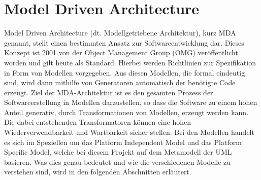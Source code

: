 \section{Model Driven Architecture} \label{MDA}
Model Driven Architecture (dt. Modellgetriebene Architektur), kurz MDA genannt,
stellt einen bestimmten Ansatz zur Softwareentwicklung dar. Dieses Konzept ist
2001 von der Object Management Group (OMG) veröffentlicht worden und gilt heute
als Standard. Hierbei werden Richtlinien zur Spezifikation in Form von Modellen
vorgegeben. Aus diesen Modellen, die formal eindeutig sind, wird dann mithilfe
von Generatoren automatisch der benötigte Code erzeugt. Ziel der MDA-Architektur
ist es den gesamten Prozess der Softwareerstellung in Modellen darzustellen, so
dass die Software  zu einem hohen Anteil generativ, durch Transformationen von
Modellen, erzeugt werden kann. Die dabei entstehenden Transformatoren können
eine hohen Wiederverwendbarkeit und Wartbarkeit sicher stellen. Bei den Modellen
handelt es sich im Speziellen um das Platform Independent Model und das Platform
Specific Model, welche bei diesem Projekt auf dem Metamodell der UML basieren.
Was dies genau bedeutet und wie die verschiedenen Modelle zu verstehen sind,
wird in den folgenden Abschnitten erläutert.
